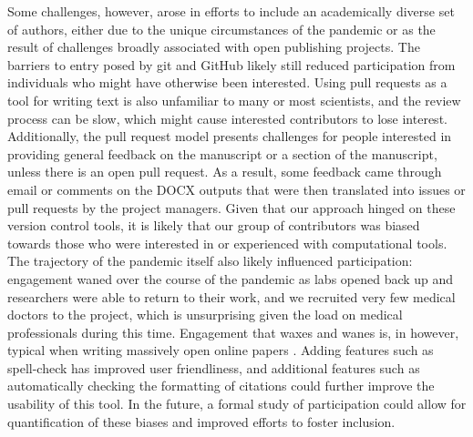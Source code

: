 \documentclass[twocolumn]{ceurart}
\begin{document}
Some challenges, however, arose in efforts to include an academically diverse set of authors, either due to the unique circumstances of the pandemic or as the result of challenges broadly associated with open publishing projects.
The barriers to entry posed by git and GitHub likely still reduced participation from individuals who might have otherwise been interested.
Using pull requests as a tool for writing text is also unfamiliar to many or most scientists, and the review process can be slow, which might cause interested contributors to lose interest.
Additionally, the pull request model presents challenges for people interested in providing general feedback on the manuscript or a section of the manuscript, unless there is an open pull request.
As a result, some feedback came through email or comments on the DOCX outputs that were then translated into issues or pull requests by the project managers.
Given that our approach hinged on these version control tools, it is likely that our group of contributors was biased towards those who were interested in or experienced with computational tools.
The trajectory of the pandemic itself also likely influenced participation: engagement waned over the course of the pandemic as labs opened back up and researchers were able to return to their work, and we recruited very few medical doctors to the project, which is unsurprising given the load on medical professionals during this time.
Engagement that waxes and wanes is, in however, typical when writing massively open online papers \citep{PoDz2q0A}.
Adding features such as spell-check has improved user friendliness, and additional features such as automatically checking the formatting of citations could further improve the usability of this tool.
In the future, a formal study of participation could allow for quantification of these biases and improved efforts to foster inclusion.
\end{document}
